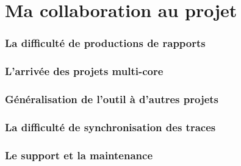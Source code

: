 \chapter{Ma collaboration au projet}\label{collab}
\putminitoc

\subsection{La difficulté de productions de rapports}

\subsection{L'arrivée des projets multi-core}
\subsection{Généralisation de l'outil à d'autres projets}
\subsection{La difficulté de synchronisation des traces}
\subsection{Le support et la maintenance}
